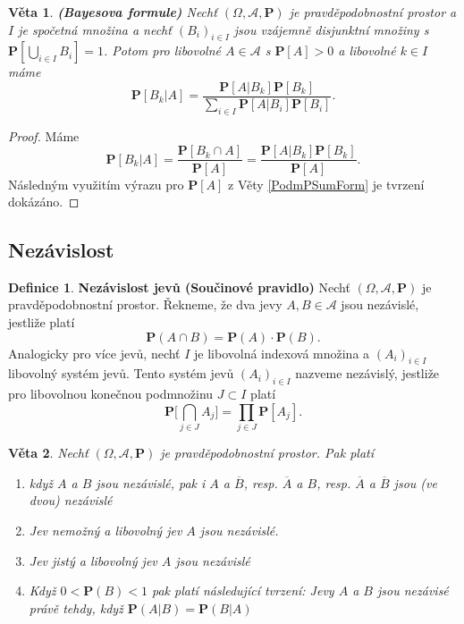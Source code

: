 \documentclass[a4]{report}
\newtheorem{theorem}{Věta}
\theoremstyle{definition}
\newtheorem{definition}{Definice}[section]
\begin{document}
{\begin{theorem}\label{PodmPBayes}\textbf{(Bayesova formule)}
 Nechť $( \Omega, \mathcal{A}, \textbf{P})$ je pravděpodobnostní prostor a $I$ je spočetná množina a nechť $(B_{i})_{i \in I}$ jsou vzájemně disjunktní množiny s $\textbf{P}[\bigcup_{i \in I}B_{i}] = 1$. Potom pro libovolné $A \in \mathcal{A}$ s $\textbf{P}[A]>0$ a libovolné $k \in I$ máme
\begin{equation}
\textbf{P}[B_{k}|A] = \frac{\textbf{P}[A|B_{k}]\textbf{P}[B_{k}]}{\sum_{i \in I}\textbf{P}[A|B_{i}]\textbf{P}[B_{i}]}.
\end{equation} 
\end{theorem}
\begin{proof}
Máme
\begin{equation}
\textbf{P}[B_{k}|A] = \frac{\textbf{P}[B_{k} \cap A]}{\textbf{P}[A]} = \frac{\textbf{P}[A|B_{k}]\textbf{P}[B_{k}]}{\textbf{P}[A]}.
\end{equation}
Následným využitím výrazu pro $\textbf{P}[A]$ z Věty \ref{PodmPSumForm} je tvrzení dokázáno.
\end{proof}

\subsection{Nezávislost}
\begin{definition}\label{DefJednoduchaNez}\textbf{Nezávislost jevů (Součinové pravidlo)} Nechť $( \Omega, \mathcal{A}, \textbf{P})$ je pravděpodobnostní prostor. Řekneme, že dva jevy $A,B \in \mathcal{A}$ jsou nezávislé, jestliže platí
\begin{equation}
\textbf{P}(A \cap B) = \textbf{P}(A) \cdot \textbf{P}(B).
\end{equation}
Analogicky pro více jevů, nechť $I$ je libovolná indexová množina a $(A_{i})_{i \in I}$ libovolný systém jevů. Tento systém jevů $(A_{i})_{i \in I}$ nazveme nezávislý, jestliže pro libovolnou konečnou podmnožinu $J \subset I$ platí
\begin{equation}
\textbf{P}\bigg[ \bigcap_{j \in J} A_{j} \bigg] = \prod_{j \in J} \textbf{P}[A_{j}].
\end{equation}
\end{definition}

\begin{theorem}
Nechť $( \Omega, \mathcal{A}, \textbf{P})$ je pravděpodobnostní prostor. Pak platí
\begin{enumerate}
\item když $A$ a $B$ jsou nezávislé, pak i $A$ a $\overline{B}$, resp. $\overline{A}$ a $B$, resp. $\overline{A}$ a $\overline{B}$ jsou (ve dvou) nezávislé
\item Jev nemožný a libovolný jev $A$ jsou nezávislé.
\item Jev jistý a libovolný jev $A$ jsou nezávislé
\item Když $0<\textbf{P}(B)<1$ pak platí následující tvrzení: Jevy $A$ a $B$ jsou nezávisé právě tehdy, když $\textbf{P}(A|B)=\textbf{P}(B|A)$
\end{enumerate}
\end{theorem}

}
\end{document}
